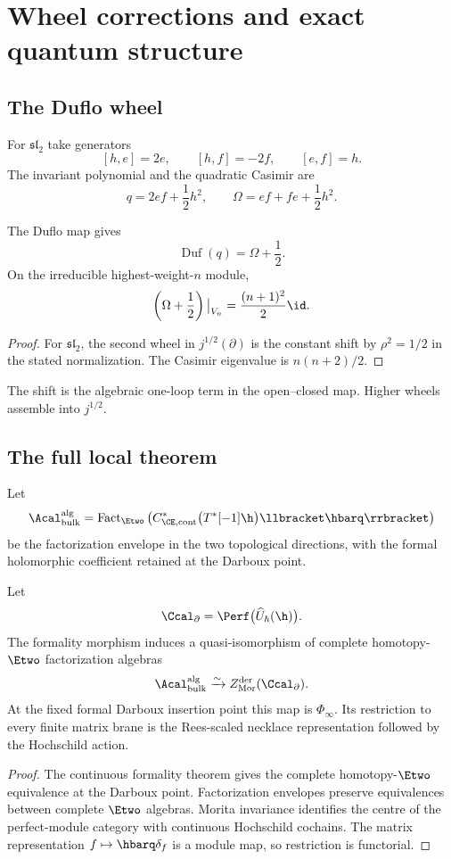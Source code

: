 \part{Wheel corrections and exact quantum structure}

\chapter{The Duflo wheel}
For $\mathfrak{sl}_2$ take generators
\[
 [h,e]=2e,
 \qquad
 [h,f]=-2f,
 \qquad
 [e,f]=h.
\]
The invariant polynomial and the quadratic Casimir are
\[
 q=2ef+\frac12h^2,
 \qquad
 \Omega=ef+fe+\frac12h^2.
\]

\begin{calculation}
The Duflo map gives
\[
 \operatorname{Duf}(q)=\Omega+\frac12.
\]
On the irreducible highest-weight-$n$ module,
\[
 \left(\Omega+\frac12\right)\big|_{V_n}
 =\frac{(n+1)^2}{2}\id.
\]
\end{calculation}
\begin{proof}
For $\mathfrak{sl}_2$, the second wheel in $j^{1/2}(\partial)$ is the constant shift by $\rho^2=1/2$ in the stated normalization.  The Casimir eigenvalue is $n(n+2)/2$.
\end{proof}

The shift is the algebraic one-loop term in the open--closed map.  Higher wheels assemble into $j^{1/2}$.

\chapter{The full local theorem}
Let
\[
 \Acal_{\mathrm{bulk}}^{\mathrm{alg}}
 =\operatorname{Fact}_{\Etwo}
 \left(
 C^*_{\CE,\mathrm{cont}}
 \bigl(T^*[-1]\h\bigr)\llbracket\hbarq\rrbracket
 \right)
\]
be the factorization envelope in the two topological directions, with the formal holomorphic coefficient retained at the Darboux point.

\begin{theorem}
Let
\[
 \Ccal_{\partial}=\Perf\bigl(\widehat U_\hbar(\h)\bigr).
\]
The formality morphism induces a quasi-isomorphism of complete homotopy-$\Etwo$ factorization algebras
\[
 \Acal_{\mathrm{bulk}}^{\mathrm{alg}}
 \xrightarrow{\sim}
 Z^{\mathrm{der}}_{\mathrm{Mor}}(\Ccal_{\partial}).
\]
At the fixed formal Darboux insertion point this map is $\Phi_\infty$.  Its restriction to every finite matrix brane is the Rees-scaled necklace representation followed by the Hochschild action.
\end{theorem}
\begin{proof}
The continuous formality theorem gives the complete homotopy-$\Etwo$ equivalence at the Darboux point.  Factorization envelopes preserve equivalences between complete $\Etwo$ algebras.  Morita invariance identifies the centre of the perfect-module category with continuous Hochschild cochains.  The matrix representation $f\mapsto\hbarq\delta_f$ is a module map, so restriction is functorial.
\end{proof}

